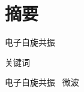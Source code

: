 %
\chapter*{摘要}
\label{sec:abstract}
\vspace*{-10mm}

电子自旋共振

\vspace*{20mm}

{关键词}\label{sec:keyword}

\vspace*{10mm}

电子自旋共振 \  微波 

